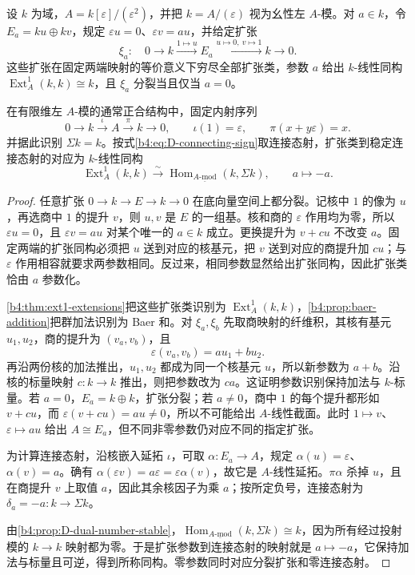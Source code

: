 \begin{proposition}\label{b4:prop:D-dual-number-extension-parameter}
	设 \(k\) 为域，\(A=k[\varepsilon]/(\varepsilon^2)\)，并把 \(k=A/(\varepsilon)\) 视为幺性左 \(A\)-模。对 \(a\in k\)，令 \(E_a=ku\oplus kv\)，规定 \(\varepsilon u=0\)、\(\varepsilon v=au\)，并给定扩张
	\[
		\xi_a:\quad0\longrightarrow k\xrightarrow{1\mapsto u}E_a \xrightarrow{u\mapsto0,\ v\mapsto1}k\longrightarrow0.
	\]
	这些扩张在固定两端映射的等价意义下穷尽全部扩张类，参数 \(a\) 给出 \(k\)-线性同构 \(\operatorname{Ext}_A^1(k,k)\cong k\)，且 \(\xi_a\) 分裂当且仅当 \(a=0\)。

	在有限维左 \(A\)-模的通常正合结构中，固定内射序列
	\[
		0\longrightarrow k\xrightarrow{\iota}A\xrightarrow{\pi}k \longrightarrow0,\qquad \iota(1)=\varepsilon,\qquad \pi(x+y\varepsilon)=x.
	\]
	并据此识别 \(\Sigma k=k\)。按式\eqref{b4:eq:D-connecting-sign}取连接态射，扩张类到稳定连接态射的对应为 \(k\)-线性同构
	\[
		\operatorname{Ext}_A^1(k,k)\xrightarrow{\sim} \operatorname{Hom}_{\underline{A\text{-}\mathrm{mod}}}(k,\Sigma k), \qquad a\longmapsto-a.
	\]
\end{proposition}
\begin{proof}
	任意扩张 \(0\to k\to E\to k\to0\) 在底向量空间上都分裂。记核中 \(1\) 的像为 \(u\)，再选商中 \(1\) 的提升 \(v\)，则 \(u,v\) 是 \(E\) 的一组基。核和商的 \(\varepsilon\) 作用均为零，所以 \(\varepsilon u=0\)，且 \(\varepsilon v=au\) 对某个唯一的 \(a\in k\) 成立。更换提升为 \(v+cu\) 不改变 \(a\)。固定两端的扩张同构必须把 \(u\) 送到对应的核基元，把 \(v\) 送到对应的商提升加 \(cu\)；与 \(\varepsilon\) 作用相容就要求两参数相同。反过来，相同参数显然给出扩张同构，因此扩张类恰由 \(a\) 参数化。

	\cref{b4:thm:ext1-extensions}把这些扩张类识别为 \(\operatorname{Ext}_A^1(k,k)\)，\cref{b4:prop:baer-addition}把群加法识别为 Baer 和。对 \(\xi_a,\xi_b\) 先取商映射的纤维积，其核有基元 \(u_1,u_2\)，商的提升为 \((v_a,v_b)\)，且
	\[
		\varepsilon(v_a,v_b)=au_1+bu_2.
	\]
	再沿两份核的加法推出，\(u_1,u_2\) 都成为同一个核基元 \(u\)，所以新参数为 \(a+b\)。沿核的标量映射 \(c:k\to k\) 推出，则把参数改为 \(ca\)。这证明参数识别保持加法与 \(k\)-标量。若 \(a=0\)，\(E_a=k\oplus k\)，扩张分裂；若 \(a\ne0\)，商中 \(1\) 的每个提升都形如 \(v+cu\)，而 \(\varepsilon(v+cu)=au\ne0\)，所以不可能给出 \(A\)-线性截面。此时 \(1\mapsto v\)、\(\varepsilon\mapsto au\) 给出 \(A\cong E_a\)，但不同非零参数仍对应不同的指定扩张。

	为计算连接态射，沿核嵌入延拓 \(\iota\)，可取 \(\alpha:E_a\to A\)，规定 \(\alpha(u)=\varepsilon\)、\(\alpha(v)=a\)。确有 \(\alpha(\varepsilon v)=a\varepsilon=\varepsilon\alpha(v)\)，故它是 \(A\)-线性延拓。\(\pi\alpha\) 杀掉 \(u\)，且在商提升 \(v\) 上取值 \(a\)，因此其余核因子为乘 \(a\)；按所定负号，连接态射为 \(\delta_a=-a:k\to\Sigma k\)。

	由\cref{b4:prop:D-dual-number-stable}，\(\operatorname{Hom}_{\underline{A\text{-}\mathrm{mod}}}(k,\Sigma k)\cong k\)，因为所有经过投射模的 \(k\to k\) 映射都为零。于是扩张参数到连接态射的映射就是 \(a\mapsto-a\)，它保持加法与标量且可逆，得到所称同构。零参数同时对应分裂扩张和零连接态射。
\end{proof}
